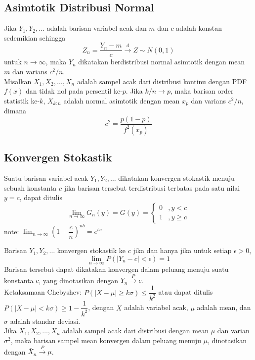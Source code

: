 \documentclass[a4paper,extrafontsizes, 9pt]{memoir}
\begin{document}
\begin{multicols}{3}
                \subsection*{\small Asimtotik Distribusi Normal}
                Jika $Y_1,Y_2,...$ adalah barisan variabel acak dan $m$ dan $c$ adalah konstan sedemikian sehingga
                \[Z_n=\dfrac{Y_n-m}{c}\xrightarrow{d}Z\sim N(0,1)\]
                untuk $n\to\infty$, maka $Y_n$ dikatakan berdistribusi normal asimtotik dengan mean $m$ dan varians $c^2/n$.\\

                Misalkan $X_1,X_2,\dots,X_n$ adalah sampel acak dari distribusi kontinu dengan PDF $f(x)$ dan tidak nol pada persentil ke-$p$. Jika $k/n\to p$, maka barisan order statistik ke-$k$, $X_{k:n}$ adalah normal asimtotik dengan mean $x_p$ dan varians $c^2/n$, dimana 
                \[c^2 = \dfrac{p(1-p)}{f^2(x_p)}\]

                \subsection*{\small Konvergen Stokastik}
                Suatu barisan variabel acak $Y_1,Y_2,\dots$ dikatakan konvergen stokastik menuju sebuah konstanta $c$ jika barisan tersebut terdistribusi terbatas pada satu nilai $y=c$, dapat ditulis
                \[\lim_{n\to\infty}G_n(y)=G(y)=\begin{cases}
                    0 &, y<c\\
                    1 &, y\geq c
                \end{cases}\]
                note: $\displaystyle\lim_{n\to\infty}\left(1+\dfrac{c}{n}\right)^{nb}=e^{bc}$

                Barisan $Y_1,Y_2,\dots$ konvergen stokastik ke $c$ jika dan hanya jika untuk setiap $\epsilon>0$, 
                \[\lim_{n\to\infty}P(|Y_n-c|<\epsilon)=1\]
                Barisan tersebut dapat dikatakan konvergen dalam peluang menuju suatu konstanta $c$, yang dinotasikan dengan $Y_n\xrightarrow{P}c$.\\

                Ketaksamaan Chebyshev: $P(|X-\mu|\geq k\sigma)\leq\dfrac{1}{k^2}$ atau dapat ditulis $P(|X-\mu|< k\sigma)\geq 1-\dfrac{1}{k^2}$,
                dengan $X$ adalah variabel acak, $\mu$ adalah mean, dan $\sigma$ adalah standar deviasi.\\

                Jika $X_1,X_2,\dots,X_n$ adalah sampel acak dari distribusi dengan mean $\mu$ dan varian $\sigma^2$, maka barisan sampel mean konvergen dalam peluang menuju $\mu$, dinotasikan dengan $\bar{X}_n\xrightarrow{P}\mu$.
                \vspace*{-0.3cm}

\end{multicols}
\end{document}
